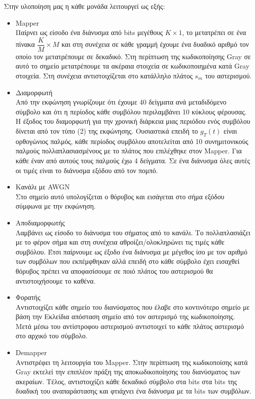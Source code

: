 \documentclass{article}
\begin{document}
\begin{enumerate}
    Στην υλοποίηση μας η κάθε μονάδα λειτουργεί ως εξής:
    \begin{itemize}
        \item Mapper \\
        Παίρνει ως είσοδο ένα διάνυσμα από bits μεγέθους $K\times1$, το μετατρέπει σε ένα πίνακα $\dfrac{K}{M}\times M$ και στη συνέχεια σε κάθε γραμμή έχουμε ένα δυαδικό αριθμό τον οποίο τον μετατρέπουμε σε δεκαδικό. Στη περίπτωση της κωδικοποίησης Gray σε αυτό το σημείο μετατρέπουμε τα ακέραια στοιχεία σε κωδικοποιημένα κατά Gray στοιχεία. Στη συνέχεια αντιστοιχίζεται στο κατάλληλο πλάτος $s_m$ του αστερισμού.
        \item Διαμορφωτή \\
        Από την εκφώνηση γνωρίζουμε ότι έχουμε 40 δείγματα ανά μεταδιδόμενο σύμβολο και ότι η περίοδος κάθε συμβόλου περιλαμβάνει 10 κύκλους φέρουσας. Η έξοδος του διαμορφωτή για την χρονική διάρκεια μιας περιόδου ενός συμβόλου δίνεται από τον τύπο (2) της εκφώνησης. Ουσιαστικά επειδή το $g_T(t)$ είναι ορθογώνιος παλμός, κάθε περίοδος συμβόλου αποτελείται από 10 συνημιτονικούς παλμούς πολλαπλασιασμένους με το πλάτος που επιλέχθηκε στον Mapper. Για κάθε έναν από αυτούς τους παλμούς έχω 4 δείγματα. Σε ένα διάνυσμα όλες αυτές οι τιμές είναι το διάνυσμα εξόδου από τον πομπό.
        \item Κανάλι με AWGN \\
        Στο σημείο αυτό υπολογίζεται ο θόρυβος και εισάγεται στο σήμα εξόδου σύμφωνα με την εκφώνηση.
        \item Αποδιαμορφωτής \\
        Λαμβάνει ως είσοδο το διάνυσμα του σήματος από το κανάλι. Το πολλαπλασιάζει με το φέρον σήμα και στη συνέχεια αθροίζει/ολοκληρώνει τις τιμές κάθε συμβόλου. Έτσι παίρνουμε ως έξοδο ένα διάνυσμα με μέγεθος ίσο με τον αριθμό των συμβόλων που εκπέμφθηκαν αλλά επειδή στο κάθε σύμβολο έχει εισαχθεί θόρυβος πρέπει να αποφασίσουμε σε ποιό πλάτος του αστερισμού θα αντιστοιχήσουμε το καθένα.
        \item Φορατής \\
        Αντιστοιχίζει κάθε σημείο του διανύσματος που έλαβε στο κοντινότερο σημείο με βάση την Εκλείδια απόσταση σημείο από τον αστερισμό της κωδικοποίησης. Μετά μέσω του αντίστροφου αστερισμού αντιστοιχεί το κάθε πλάτος αστερισμό στο αρχικό του σύμβολο.
        \item Demapper \\
        Αντιστρέφει τη λειτουργία του Mapper. Στην περίπτωση της κωδικοποίσης κατά Gray εκτελεί την επιπλέον πράξη της αποκωδικοποίησης του διανύσματος των ακεραίων. Τέλος, αντιστοιχίζει κάθε δεκαδικό σύμβολο στα bits στα bits της δυαδική του αναπαράστασης και φτιάχνει ένα διάνυσμα με τα bits των συμβόλων.
    \end{itemize}
    

\end{enumerate}
\end{document}

